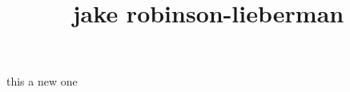 \documentclass[11pt, oneside]{article}
\title{jake robinson-lieberman}
\begin{document}
this a new one
\maketitle
\end{document}

